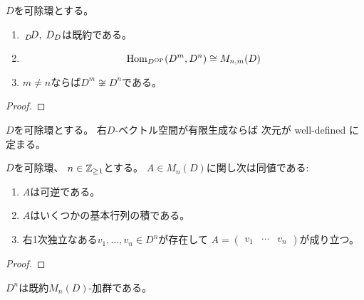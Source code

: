 \documentclass[report]{jlreq}
\begin{document}
\begin{theorem}
    $D$を可除環とする。
    \begin{enumerate}
        \item $\,{}_{D}\!D, \; D_D$は既約である。
        \item \TODO{}
            \begin{equation}
                \operatorname{Hom}_{D^{\mathrm{OP}}}(D^m, D^n) \cong M_{n, m}(D)
            \end{equation}
        \item $m \neq n$ならば$D^m \not\cong D^n$である。
    \end{enumerate}
\end{theorem}

\begin{proof}
    \TODO{}
\end{proof}

\begin{definition}[右ベクトル空間の次元]
    $D$を可除環とする。
    右$D$-ベクトル空間が有限生成ならば
    次元が well-defined に定まる。
    \TODO{}
\end{definition}

\begin{theorem}
    $D$を可除環、
    $n \in \mathbb{Z}_{\ge 1}$とする。
    $A \in M_n(D)$に関し次は同値である:
    \begin{enumerate}
        \item $A$は可逆である。
        \item $A$はいくつかの基本行列の積である。
        \item 右1次独立なある$v_1, \dots, v_n \in D^n$が存在して
            $A = \begin{pmatrix}
                v_1 & \cdots & v_n
            \end{pmatrix}$が成り立つ。
    \end{enumerate}
\end{theorem}

\begin{proof}
    \TODO{}
\end{proof}


\begin{corollary}
    $D^n$は既約$M_n(D)$-加群である。
\end{corollary}
\end{document}
